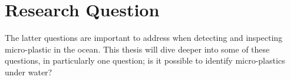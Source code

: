 







\section{Research Question}
The latter questions are important to address when detecting and inspecting micro-plastic in the ocean. This thesis will dive deeper into some of these questions, in particularly one question; is it possible to identify micro-plastics under water?

